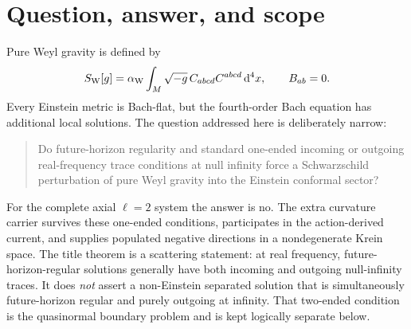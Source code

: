 \documentclass[11pt]{article}
\theoremstyle{definition}
\theoremstyle{remark}
\newcommand{\dd}{\mathrm d}
\begin{document}
\begin{abstract}
On the certified cell
\(\omega\in[0.49995,0.50005]\) the outgoing and future-horizon spaces are
matching three-channel Krein spaces, the outgoing map is invertible, and the
one-sided scattering map obeys the exact integrated pseudo-isometry.  Analytic
continuation gives outgoing population on an open dense, full-measure subset
of the positive axis; possible failures are isolated scalar reflection zeros.
The same filtration excludes exponentially growing separated axial modes.

Finally, a validated projective Evans calculation encloses one simple damped
spin-two quasinormal frequency and certifies a nonzero intrinsic extension
selector.  The spin-one factor is a local unit there.  The complete connection
therefore has Smith valuations \((0,0,2)\), algebraic multiplicity two,
geometric multiplicity one, and one length-two connection root chain.  This is
an intrinsic exceptional point: its generalized root vector has a nonzero
Ricci-carrier quotient.  Exact finite-radius boundary reduction further
promotes it to a nonzero rank-one second-order pole of the reduced radial
Green operator.  No causal spacetime resolvent, inverse-Laplace deformation,
or global \(t e^{i\omega t}\) ringdown theorem is inferred in this paper.
The successor Paper~17 identifies the compactly cut-off transfer as the
meromorphic continuation of a retarded mode-reduced parent response; the
inverse-Laplace deformation remains open.
\end{abstract}

\section{Question, answer, and scope}

Pure Weyl gravity is defined by
\begin{equation}
 S_{\rm W}[g]
 =\alpha_{\rm W}\int_M\sqrt{-g}\,
 C_{abcd}C^{abcd}\,\dd^4x,
 \qquad
 B_{ab}=0.
\end{equation}
Every Einstein metric is Bach-flat, but the fourth-order Bach equation has
additional local solutions.  The question addressed here is deliberately
narrow:

\begin{quote}
Do future-horizon regularity and standard one-ended incoming or outgoing
real-frequency trace conditions at null infinity force a Schwarzschild
perturbation of pure Weyl gravity into the Einstein conformal sector?
\end{quote}

For the complete axial \(\ell=2\) system the answer is no.  The extra
curvature carrier survives these one-ended conditions, participates in the
action-derived current, and supplies populated negative directions in a
nondegenerate Krein space.  The title theorem is a scattering statement:
at real frequency, future-horizon-regular solutions generally have both
incoming and outgoing null-infinity traces.  It does \emph{not} assert a
non-Einstein separated solution that is simultaneously future-horizon
regular and purely outgoing at infinity.  That two-ended condition is the
quasinormal boundary problem and is kept logically separate below.
\end{document}

